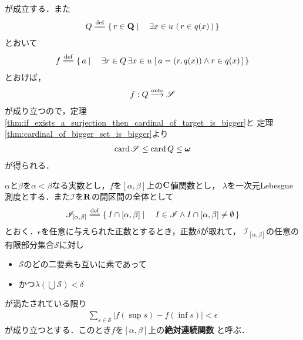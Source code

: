 \begin{sketch}
		が成立する．また
		\begin{align}
			Q \defeq \Set{r \in \Q}{\exists x \in u\, \left(\, r \in q(x)\, \right)}
		\end{align}
		とおいて
		\begin{align}
			f \defeq \Set{a}{\exists r \in Q \, \exists x \in u\, \left[\, a = (r,q(x)) \wedge r \in q(x)\, \right]}
		\end{align}
		とおけば，
		\begin{align}
			f: Q \overset{\mathrm{onto}}{\longrightarrow} \mathscr{S}
		\end{align}
		が成り立つので，定理\ref{thm:if_exists_a_surjection_then_cardinal_of_target_is_bigger}と
		定理\ref{thm:cardinal_of_bigger_set_is_bigger}より
		\begin{align}
			\operatorname{card} \mathscr{S} \leq \operatorname{card} Q \leq {\boldsymbol \omega}
		\end{align}
		が得られる．
		\QED
	\end{sketch}
	
	\begin{screen}
		\begin{dfn}[絶対連続関数]
			$\alpha$と$\beta$を$\alpha < \beta$なる実数とし，$f$を$[\alpha,\beta]$上の$\mathbf{C}$値関数とし，
			$\lambda$を一次元Lebesgue測度とする．また$\mathscr{I}$を$\mathbf{R}$の開区間の全体として
			\begin{align}
				\mathscr{I}_{[\alpha,\beta]} \defeq
				\Set{I \cap [\alpha,\beta]}{I \in \mathscr{I} \wedge I \cap [\alpha,\beta] \neq \emptyset}
			\end{align}
			とおく．$\epsilon$を任意に与えられた正数とするとき，正数$\delta$が取れて，
			$\mathscr{I}_{[\alpha,\beta]}$の任意の有限部分集合$\mathscr{S}$に対し
			\begin{itemize}
				\item $\mathscr{S}$のどの二要素も互いに素であって
				\item かつ$\lambda\left(\bigcup \mathscr{S}\right) < \delta$
			\end{itemize}
			が満たされている限り
			\begin{align}
				\sum_{s \in \mathscr{S}} |f(\sup{}{s}) - f(\inf{}{s})| < \epsilon
			\end{align}
			が成り立つとする．このとき$f$を$[\alpha,\beta]$上の{\bf 絶対連続関数}
			と呼ぶ．
		\end{dfn}
	\end{screen}
	

